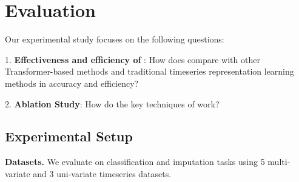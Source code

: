 \section{Evaluation}
\label{sec.exp}

Our experimental study focuses on the following questions:

1. \textbf{Effectiveness and efficiency of \system}: How does \system compare with other Transformer-based methods and traditional timeseries representation learning methods in accuracy and efficiency?



2. \textbf{Ablation Study}: How do the key techniques of \system work?

\subsection{Experimental Setup}
\label{sec.exp.setup}
\noindent\textbf{Datasets.}
We evaluate \system on classification and imputation tasks using 5 multi-variate and 3 uni-variate timeseries datasets.

